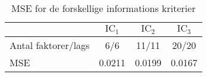 \begin{table}
\center
\begin{tabular}{lccc}
\toprule
& $\text{IC}_1$ & $\text{IC}_2$ & $\text{IC}_3$ \\
\midrule 
Antal faktorer/lags & 6/6 & 11/11 & 20/20  \\ 
MSE &  0.0211 & 0.0199  & 0.0167 \\ \bottomrule
 \end{tabular}
\caption{MSE for de forskellige informations kriterier} \label{tab:factor_mse_tab}
\end{table}